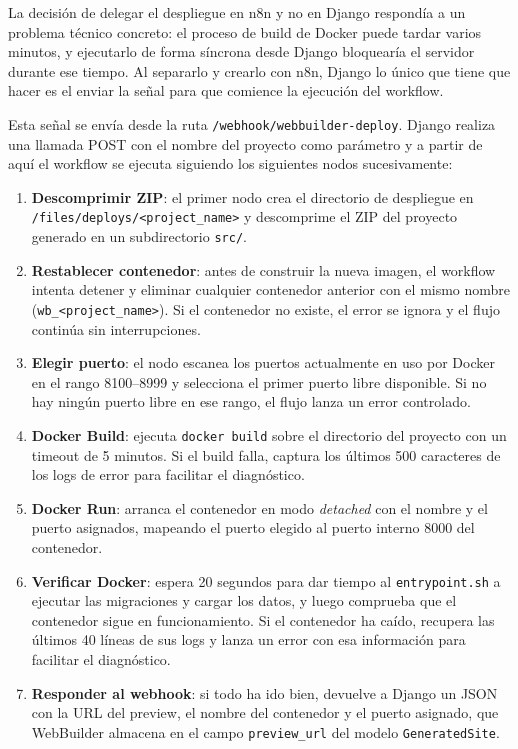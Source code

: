 La decisión de delegar el despliegue en n8n y no en Django respondía 
a un problema técnico concreto: el proceso de build de Docker puede 
tardar varios minutos, y ejecutarlo de forma síncrona desde Django 
bloquearía el servidor durante ese tiempo. Al separarlo y crearlo con n8n, Django lo único que tiene que hacer es el enviar la señal para que comience la ejecución del workflow.

Esta señal se envía desde la ruta \texttt{/webhook/webbuilder-deploy}. Django realiza una llamada POST con el nombre del proyecto como parámetro y a partir de aquí el workflow se ejecuta siguiendo los siguientes nodos sucesivamente:

\begin{enumerate}
    \item \textbf{Descomprimir ZIP}: el primer nodo crea el directorio de despliegue en \\ \texttt{/files/deploys/<project\_name>} y descomprime el ZIP del proyecto generado en un subdirectorio \texttt{src/}.
    \item \textbf{Restablecer contenedor}: antes de construir la nueva imagen, el workflow intenta detener y eliminar cualquier contenedor anterior con el mismo nombre (\texttt{wb\_<project\_name>}). Si el contenedor no existe, el error se ignora y el flujo continúa sin interrupciones.
    
    \item \textbf{Elegir puerto}: el nodo escanea los puertos actualmente en uso por Docker en el rango 8100--8999 y selecciona el primer puerto libre disponible. Si no hay ningún puerto libre en ese rango, el flujo lanza un error controlado.
    
    \item \textbf{Docker Build}: ejecuta \texttt{docker build} sobre el directorio del proyecto con un timeout de 5 minutos. Si el build falla, captura los últimos 500 caracteres de los logs de error para facilitar el diagnóstico.
    
    \item \textbf{Docker Run}: arranca el contenedor en modo \emph{detached} con el nombre y el puerto asignados, mapeando el puerto elegido al puerto interno 8000 del contenedor.
    
    \item \textbf{Verificar Docker}: espera 20 segundos para dar tiempo al \texttt{entrypoint.sh} a ejecutar las migraciones y cargar los datos, y luego comprueba que el contenedor sigue en funcionamiento. Si el contenedor ha caído, recupera las últimos 40 líneas de sus logs y lanza un error con esa información para facilitar el diagnóstico.

    \item \textbf{Responder al webhook}: si todo ha ido bien, devuelve a Django un JSON con la URL del preview, el nombre del contenedor y el puerto asignado, que WebBuilder almacena en el campo \texttt{preview\_url} del modelo \texttt{GeneratedSite}.
\end{enumerate}

